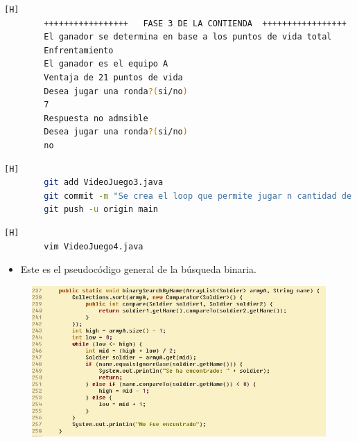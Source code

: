 \documentclass{article}
\begin{document}
\begin{lstlisting}[language=bash,caption={Compilando y probando  }][H]
		+++++++++++++++++   FASE 3 DE LA CONTIENDA  +++++++++++++++++
		El ganador se determina en base a los puntos de vida total
		Enfrentamiento
		El ganador es el equipo A
		Ventaja de 21 puntos de vida
		Desea jugar una ronda?(si/no)
		7 
		Respuesta no admsible
		Desea jugar una ronda?(si/no)
		no
	\end{lstlisting}
 

	\begin{lstlisting}[language=bash,caption={Commit: 41ffd9ca2d4934c86227d650940d5a93865bc037}][H]
		git add VideoJuego3.java
		git commit -m "Se crea el loop que permite jugar n cantidad de veces"			
		git push -u origin main
	\end{lstlisting}

	
	
	
	
	
	
		
	\begin{lstlisting}[language=bash,caption={Se implementa un método que realiza una búsqueda Binaria según el nombre}][H]
		vim VideoJuego4.java
	\end{lstlisting}
	
	
	
	
	\begin{itemize}	
		\item Este es el pseudocódigo general de la búsqueda binaria.
	\end{itemize}
	
	
	
	\begin{figure}[H]
		\centering
		\includegraphics[width=1\textwidth,keepaspectratio]{img/binarySearch.jpg}
	\end{figure}
	
\end{document}
